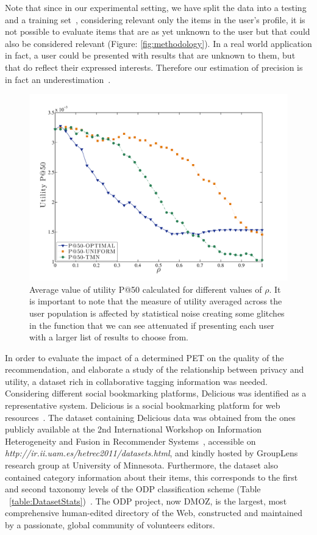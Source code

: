 Note that since in our experimental setting, we have split the data into a testing and a training set~\cite{a02,a03}, considering relevant only the items in the user's profile, it is not possible to evaluate items that are as yet unknown to the user but that could also be considered relevant (Figure: \ref{fig:methodology}).  In a real world application in fact, a user could be presented with results that are unknown to them, but that do reflect their expressed interests. Therefore our estimation of precision is in fact an underestimation~\cite{a23}.

\begin{figure}[htb]  
\includegraphics[width=\textwidth]{figures/Fig5b.pdf}
\caption[Utility measurement P@50.]{Average value of utility P@50 calculated for different values of $\rho$. It is important to note that the measure of utility averaged across the user population is affected by statistical noise creating some glitches in the function that we can see attenuated if presenting each user with a larger list of results to choose from.
\label{fig:P50-Rho}}
\end{figure}

In order to evaluate the impact of a determined PET on the quality of the recommendation, and elaborate a study of the relationship between privacy and utility, a dataset rich in collaborative tagging information was needed.  Considering different social bookmarking platforms, Delicious was identified as a representative system. Delicious is a social bookmarking platform for web resources~\cite{delicious}. The dataset containing Delicious data was obtained from the ones publicly available at the 2nd International Workshop on Information Heterogeneity and Fusion in Recommender Systems~\cite{a21}, accessible on \emph{http://ir.ii.uam.es/hetrec2011/datasets.html}, and kindly hosted by  GroupLens research group at University of Minnesota. Furthermore, the dataset also contained category information about their items, this corresponds to the first and second taxonomy levels of the ODP classification scheme (Table ~\ref{table:DatasetStats})~\cite{a22}. The ODP project, now DMOZ, is the largest, most comprehensive human-edited directory of the Web, constructed and maintained by a passionate, global community of volunteers editors.

